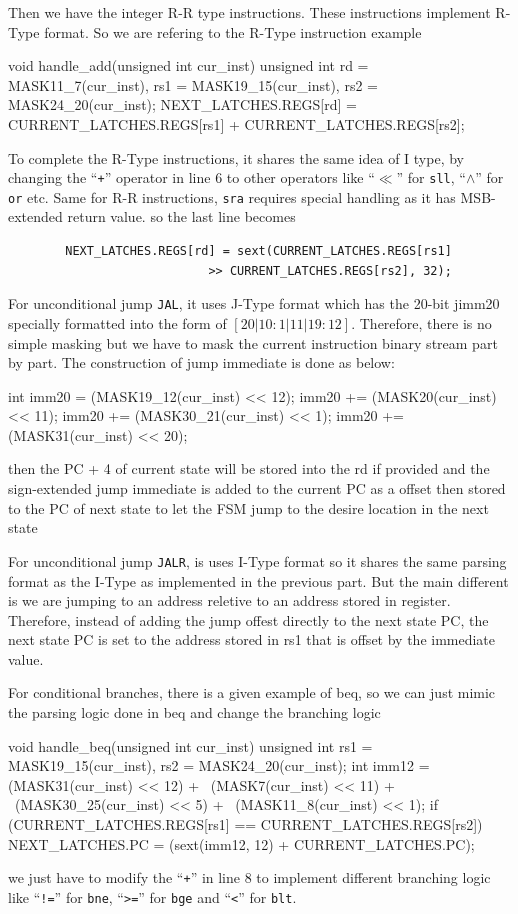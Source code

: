 \documentclass[12pt, a4paper]{article}
\begin{document}
\begin{ans}
\indent Then we have the integer R-R type instructions. These instructions implement R-Type format. So we are refering to the R-Type instruction example
\begin{code}
void handle_add(unsigned int cur_inst) {
    unsigned int rd = MASK11_7(cur_inst),
                rs1 = MASK19_15(cur_inst),
                rs2 = MASK24_20(cur_inst);
    NEXT_LATCHES.REGS[rd] = CURRENT_LATCHES.REGS[rs1] 
                            + CURRENT_LATCHES.REGS[rs2];
}
\end{code}
To complete the R-Type instructions, it shares the same idea of I type, 
by changing the ``\texttt{+}'' operator in line 6 to other operators like ``$\ll$'' for \texttt{sll}, ``$\wedge$'' for \texttt{or} etc. 
Same for R-R instructions, \texttt{sra} requires special handling as it has MSB-extended return value. 
so the last line becomes
\begin{verbatim}
        NEXT_LATCHES.REGS[rd] = sext(CURRENT_LATCHES.REGS[rs1] 
                            >> CURRENT_LATCHES.REGS[rs2], 32);
\end{verbatim}
For unconditional jump \texttt{JAL}, it uses J-Type format which has the 20-bit jimm20 specially formatted into the form 
of $[20|10:1|11|19:12]$. Therefore, there is no simple masking but we have to mask the current instruction binary stream part by part. 
The construction of jump immediate is done as below: 
\begin{code}
int imm20 = (MASK19_12(cur_inst) << 12);
    imm20 += (MASK20(cur_inst) << 11);
    imm20 += (MASK30_21(cur_inst) << 1);
    imm20 += (MASK31(cur_inst) << 20);
\end{code}
then the PC + 4 of current state will be stored into the rd if provided
and the sign-extended jump immediate is added to the current PC as a offset then stored to 
the PC of next state to let the FSM jump to the desire location in the next state

For unconditional jump \texttt{JALR}, is uses I-Type format so it shares the same parsing format as the I-Type as implemented in the previous part. 
But the main different is we are jumping to an address reletive to an address stored in register. Therefore, instead of adding the jump offest directly to the 
next state PC, the next state PC is set to the address stored in rs1 that is offset by the immediate value. 

For conditional branches, there is a given example of beq, so we can just mimic the parsing logic done in beq and change the branching logic
\begin{code}
void handle_beq(unsigned int cur_inst) {
    unsigned int rs1 = MASK19_15(cur_inst), rs2 = MASK24_20(cur_inst);
    int imm12 = (MASK31(cur_inst) << 12) + \
            (MASK7(cur_inst) << 11) + \
            (MASK30_25(cur_inst) << 5) + \
            (MASK11_8(cur_inst) << 1);
    if (CURRENT_LATCHES.REGS[rs1] == CURRENT_LATCHES.REGS[rs2])
        NEXT_LATCHES.PC = (sext(imm12, 12) + CURRENT_LATCHES.PC);
}
\end{code}
we just have to modify the ``\texttt{+}'' in line 8 to implement different branching logic like ``\texttt{!=}'' for \texttt{bne}, ``\texttt{>=}'' for \texttt{bge} and
``\texttt{<}'' for \texttt{blt}. 


\end{ans}
\end{document}
